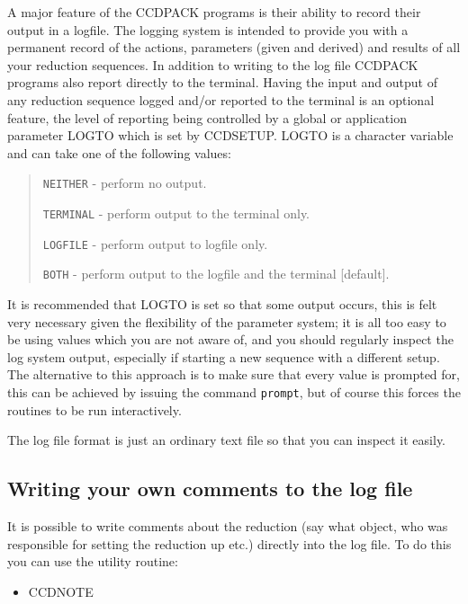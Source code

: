 \documentclass[twoside,11pt]{article}
\newcommand{\htmlref}[2]{#1}
\newcommand{\latexhtml}[2]{#1}
\renewcommand{\_}{\texttt{\symbol{95}}}
\newcommand{\ttsize}{\latexhtml{\small}{}}
\newenvironment{myquote}{\begin{quote}\ttsize}{\end{quote}}
\newcommand{\text}[1]{{\ttsize \tt #1}}
\newcommand{\xroutine}[1]{\htmlref{{\sc #1}}{#1}}
\begin{document}
A major feature of the CCDPACK programs is their ability to record
their output in a logfile. The logging
system is intended to provide you with a permanent record of the
actions, parameters (given and derived) and results of all your
reduction sequences. In addition to writing to the log file CCDPACK
programs also report directly to the terminal.  Having the input and output of
any reduction sequence logged and/or reported to the terminal is an
optional feature, the level of reporting being controlled by a global
or application parameter LOGTO which is set by
\xroutine{CCDSETUP}. LOGTO is a character variable and can take
one of the following values:
\begin{myquote}
\begin{description}
\item \text{NEITHER} - perform no output.
\item \text{TERMINAL} - perform output to the terminal only.
\item \text{LOGFILE} - perform output to logfile only.
\item \text{BOTH} - perform output to the logfile and the terminal [default].
\end{description}
\end{myquote}
It is recommended that LOGTO is set so that some output
occurs, this is felt very necessary given the flexibility of the
parameter system; it is all too easy to be using values which you are
not aware of, and you should regularly inspect the log system output,
especially if starting a new sequence with a different setup. The
alternative to this approach is to make sure that every value is
prompted for, this can be achieved by issuing the command
\text{prompt}, but of course this forces the routines to be run
interactively.

The log file format is just an ordinary text file so that you can inspect
it easily.

\subsection{Writing your own comments to the log file}

It is possible to write comments about the reduction (say what object,
who was responsible for setting the reduction up etc.) directly into the
log file. To do this you can use the utility routine:
\begin{itemize}
\item \xroutine{CCDNOTE}
\end{itemize}
\end{document}
